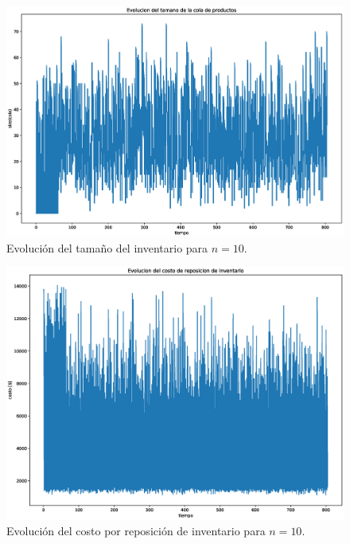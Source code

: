 \documentclass[10pt]{article}
\begin{document}
\begin{figure}[h]
	\centering 
	\includegraphics[width=1\textwidth]{img/EvolucionInventario10} 
	\caption{Evolución del tamaño del inventario para $n=10$.} 
	\label{fig:EvolucionInventario10} 
\end{figure}

\begin{figure}[h] 
	\centering 
	\includegraphics[width=1\textwidth]{img/CostoReposicion10} 
	\caption{Evolución del costo por reposición de inventario para $n=10$.} 
	\label{fig:CostoReposicion10} 
\end{figure}
\end{document}
